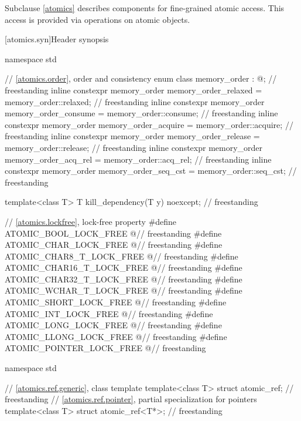 \pnum
Subclause \ref{atomics} describes components for fine-grained atomic access.
This access is provided via operations on atomic objects.

[atomics.syn]{Header  synopsis}

%
\begin{codeblock}
namespace std {
  // \ref{atomics.order}, order and consistency
  enum class memory_order : @\unspecnc@;                                            // freestanding
  inline constexpr memory_order memory_order_relaxed = memory_order::relaxed;       // freestanding
  inline constexpr memory_order memory_order_consume = memory_order::consume;       // freestanding
  inline constexpr memory_order memory_order_acquire = memory_order::acquire;       // freestanding
  inline constexpr memory_order memory_order_release = memory_order::release;       // freestanding
  inline constexpr memory_order memory_order_acq_rel = memory_order::acq_rel;       // freestanding
  inline constexpr memory_order memory_order_seq_cst = memory_order::seq_cst;       // freestanding

  template<class T>
    T kill_dependency(T y) noexcept;                                                // freestanding
}

// \ref{atomics.lockfree}, lock-free property
#define ATOMIC_BOOL_LOCK_FREE @\unspecnc@                                           // freestanding
#define ATOMIC_CHAR_LOCK_FREE @\unspecnc@                                           // freestanding
#define ATOMIC_CHAR8_T_LOCK_FREE @\unspecnc@                                        // freestanding
#define ATOMIC_CHAR16_T_LOCK_FREE @\unspecnc@                                       // freestanding
#define ATOMIC_CHAR32_T_LOCK_FREE @\unspecnc@                                       // freestanding
#define ATOMIC_WCHAR_T_LOCK_FREE @\unspecnc@                                        // freestanding
#define ATOMIC_SHORT_LOCK_FREE @\unspecnc@                                          // freestanding
#define ATOMIC_INT_LOCK_FREE @\unspecnc@                                            // freestanding
#define ATOMIC_LONG_LOCK_FREE @\unspecnc@                                           // freestanding
#define ATOMIC_LLONG_LOCK_FREE @\unspecnc@                                          // freestanding
#define ATOMIC_POINTER_LOCK_FREE @\unspecnc@                                        // freestanding

namespace std {
  // \ref{atomics.ref.generic}, class template 
  template<class T> struct atomic_ref;                                              // freestanding
  // \ref{atomics.ref.pointer}, partial specialization for pointers
  template<class T> struct atomic_ref<T*>;                                          // freestanding

}
\end{codeblock}
